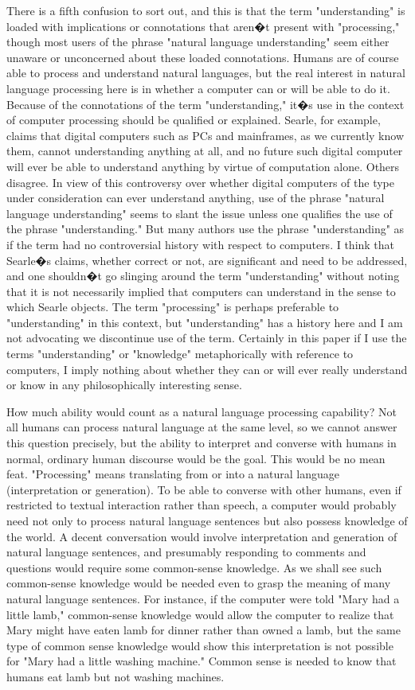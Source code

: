 There is a fifth confusion to sort out, and this is that the term "understanding" is loaded with implications or connotations that aren�t present with "processing," though most users of the phrase "natural language understanding" seem either unaware or unconcerned about these loaded connotations. Humans are of course able to process and understand natural languages, but the real interest in natural language processing here is in whether a computer can or will be able to do it. Because of the connotations of the term "understanding," it�s use in the context of computer processing should be qualified or explained. Searle, for example, claims that digital computers such as PCs and mainframes, as we currently know them, cannot understanding anything at all, and no future such digital computer will ever be able to understand anything by virtue of computation alone. Others disagree. In view of this controversy over whether digital computers of the type under consideration can ever understand anything, use of the phrase "natural language understanding" seems to slant the issue unless one qualifies the use of the phrase "understanding." But many authors use the phrase "understanding" as if the term had no controversial history with respect to computers. I think that Searle�s claims, whether correct or not, are significant and need to be addressed, and one shouldn�t go slinging around the term "understanding" without noting that it is not necessarily implied that computers can understand in the sense to which Searle objects. The term "processing" is perhaps preferable to "understanding" in this context, but "understanding" has a history here and I am not advocating we discontinue use of the term. Certainly in this paper if I use the terms "understanding" or "knowledge" metaphorically with reference to computers, I imply nothing about whether they can or will ever really understand or know in any philosophically interesting sense.

How much ability would count as a natural language processing capability? Not all humans can process natural language at the same level, so we cannot answer this question precisely, but the ability to interpret and converse with humans in normal, ordinary human discourse would be the goal. This would be no mean feat. "Processing" means translating from or into a natural language (interpretation or generation). To be able to converse with other humans, even if restricted to textual interaction rather than speech, a computer would probably need not only to process natural language sentences but also possess knowledge of the world. A decent conversation would involve interpretation and generation of natural language sentences, and presumably responding to comments and questions would require some common-sense knowledge. As we shall see such common-sense knowledge would be needed even to grasp the meaning of many natural language sentences. For instance, if the computer were told "Mary had a little lamb," common-sense knowledge would allow the computer to realize that Mary might have eaten lamb for dinner rather than owned a lamb, but the same type of common sense knowledge would show this interpretation is not possible for "Mary had a little washing machine." Common sense is needed to know that humans eat lamb but not washing machines.

